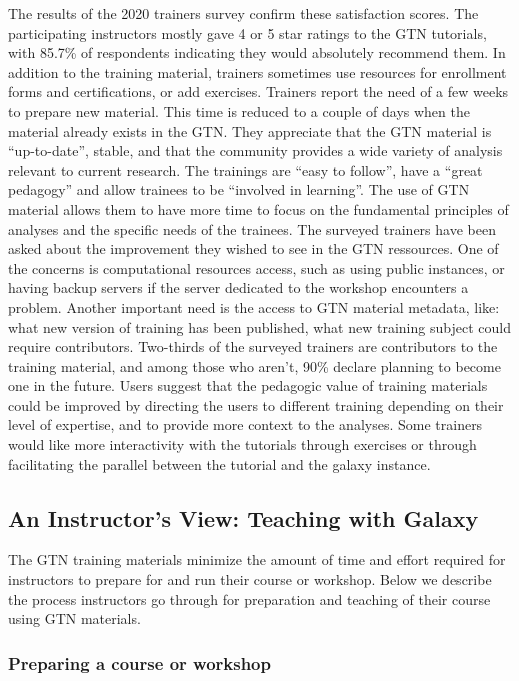 \documentclass[10pt,letterpaper]{article}
\begin{document}
The results of the 2020 trainers survey confirm these satisfaction scores. The participating instructors mostly gave 4 or 5 star ratings to the GTN tutorials, with 85.7\% of respondents indicating they would absolutely recommend them.
In addition to the training material, trainers sometimes use resources for enrollment forms and certifications, or add exercises.
Trainers report the need of a few weeks to prepare new material.
This time is reduced to a couple of days when the material already exists in the GTN.
They appreciate that the GTN material is “up-to-date”, stable, and that the community provides a wide variety of analysis relevant to current research.
The trainings are “easy to follow”, have a “great pedagogy” and allow trainees to be “involved in learning”.
The use of GTN material allows them to have more time to focus on the fundamental principles of  analyses and the specific needs of the trainees.
The surveyed trainers have been asked about the improvement they wished to see in the GTN ressources.
One of the concerns is computational resources access, such as using public instances, or having backup servers if the server dedicated to the workshop encounters a problem.
Another important need is the access to GTN material metadata, like:  what new version of training has been published, what new training subject could require contributors.
Two-thirds of the surveyed trainers are contributors to the training material, and among those who aren’t, 90\% declare planning to become one in the future.
Users suggest that the pedagogic value of training materials could be improved by directing the users to different training depending on their level of expertise, and to provide more context to the analyses.
Some trainers would like more interactivity with the tutorials through exercises or through facilitating the parallel between the tutorial and the galaxy instance.


\subsection*{An Instructor's View: Teaching with Galaxy}

The GTN training materials minimize the amount of time and effort required for instructors to prepare for and run their course or workshop. Below we describe the process instructors go through for preparation and teaching of their course using GTN materials.


\subsubsection*{Preparing a course or workshop}
\end{document}
